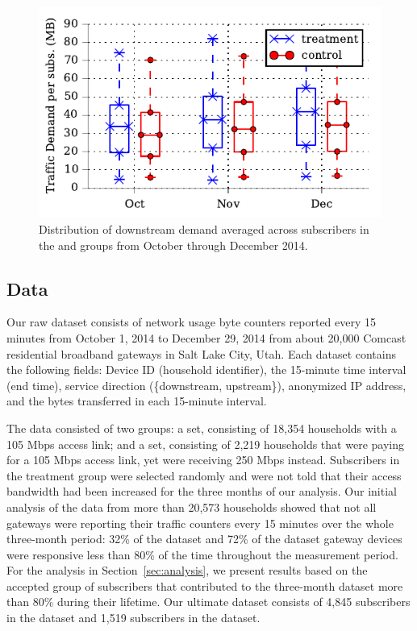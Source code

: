 
\begin{figure}[t]
\centering
\includegraphics[width=0.55\linewidth]{figures/boxplot_monthly_avg_demand_downlink.pdf}
  \caption{Distribution of downstream demand averaged across subscribers in the \control{} and \treatment{} groups from October through December 2014.\label{fig:traffic-load}}
\end{figure}
\subsection{Data}

Our raw dataset consists of network usage byte counters reported every 15
minutes from October 1, 2014 to December 29, 2014 from about 20,000
Comcast residential broadband gateways in Salt Lake City, Utah. Each
dataset contains the following fields: Device ID (household identifier), the 15-minute time interval (end time), service direction (\{downstream, upstream\}), anonymized IP address, and the bytes transferred in each 15-minute interval.

The data consisted of two groups: a \control{} set, consisting of
18,354 households with a 105 Mbps access link; and a \treatment{} set,
consisting of 2,219 households that were paying for a 105 Mbps access
link, yet were receiving 250 Mbps instead.  Subscribers in the
treatment group were selected randomly and were not told that their
access bandwidth had been increased for the three months of our analysis.
Our initial analysis of the data
from more than 20,573 households showed that not all gateways were
reporting their traffic counters every 15 minutes over the whole three-month
period: 32\% of the \treatment{} dataset and 72\% of the \control{} dataset
gateway devices were responsive less than 80\% of the time throughout the measurement period.
For the analysis in Section~\ref{sec:analysis}, we present results based on the
accepted group of subscribers that contributed to the three-month dataset
more than 80\% during their lifetime. \textrm{Our ultimate dataset consists of
4,845 subscribers in the \control{} dataset and 1,519 subscribers in the
\treatment{} dataset.}

